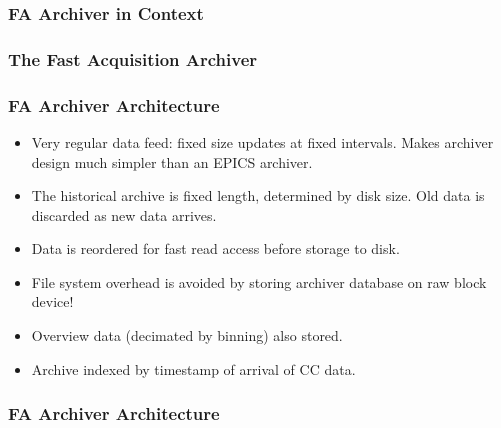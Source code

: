 \documentclass{beamer}
\begin{document}
%
\begin{frame}\frametitle{FA Archiver in Context}
\begin{center}

\end{center}
\end{frame}



%
\begin{frame}\frametitle{The Fast Acquisition Archiver}
\begin{center}

\end{center}
\end{frame}



%
\begin{frame}\frametitle{FA Archiver Architecture}

\begin{itemize}

\item Very regular data feed: fixed size updates at fixed intervals.
Makes archiver design much simpler than an EPICS archiver.

\item The historical archive is fixed length, determined by disk size.  Old data
is discarded as new data arrives.

\item Data is reordered for fast read access before storage to disk.

\item File system overhead is avoided by storing archiver database on raw block
device!

\item Overview data (decimated by binning) also stored.

\item Archive indexed by timestamp of arrival of CC data.

\end{itemize}
\end{frame}



%
\begin{frame}\frametitle{FA Archiver Architecture}

\end{frame}
\end{document}
